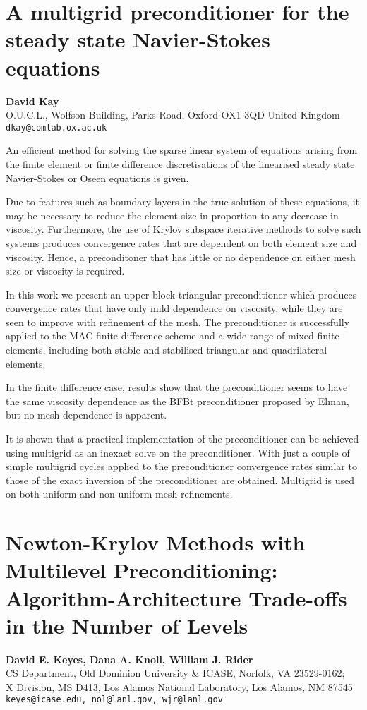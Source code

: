 \documentclass[11pt]{article}
\newcommand{\nextab}[4]{
	\section{#2}
	{\bf #1} \\ \nopagebreak
	{#3} \\ \nopagebreak
	{\tt #4} \nopagebreak
	}
\begin{document}

\nextab{David Kay}
	{A multigrid preconditioner for the steady state
		Navier-Stokes equations}
	{O.U.C.L., Wolfson Building, Parks Road,
		Oxford  OX1 3QD United Kingdom}
	{dkay@comlab.ox.ac.uk}

An efficient method for solving the sparse linear system of equations
arising from the finite element or finite difference
discretisations of the linearised
steady state Navier-Stokes or Oseen equations is given.

Due to features such as boundary layers in the true solution of these
equations, it may be necessary to reduce the
element size in proportion to any decrease in viscosity. Furthermore,
the use of Krylov subspace iterative
methods to solve such systems produces convergence rates that are
dependent on both element size and viscosity. Hence, a preconditoner
that has little or no dependence on either mesh size or viscosity
is required.

In this work we present an upper block triangular preconditioner
which produces convergence rates that have only mild dependence on
viscosity, while they are seen to improve with
refinement of the mesh.
The preconditioner is successfully applied to the MAC finite
difference scheme and a wide range of
mixed finite elements, including both stable and stabilised
triangular and quadrilateral elements.

In the finite difference case, results show that the preconditioner
seems to have the same viscosity dependence as the BFBt preconditioner
proposed by Elman, but no mesh dependence is apparent.

It is shown that a practical implementation of the preconditioner
can be achieved using multigrid as an inexact solve on the
preconditioner. With just a couple of simple multigrid
cycles applied to the preconditioner convergence rates similar
to those of the exact inversion of the preconditioner are obtained.
Multigrid is used on both uniform and non-uniform mesh refinements.


\nextab{David E. Keyes, Dana A. Knoll, William J. Rider}
	{Newton-Krylov Methods with Multilevel Preconditioning:
	Algorithm-Architecture Trade-offs in the Number of Levels}
	{CS Department, Old Dominion University \& ICASE,
		Norfolk, VA 23529-0162; \\
		X Division, MS D413, Los Alamos National Laboratory,
		Los Alamos, NM 87545
		}
	{keyes@icase.edu, nol@lanl.gov, wjr@lanl.gov}
\end{document}
